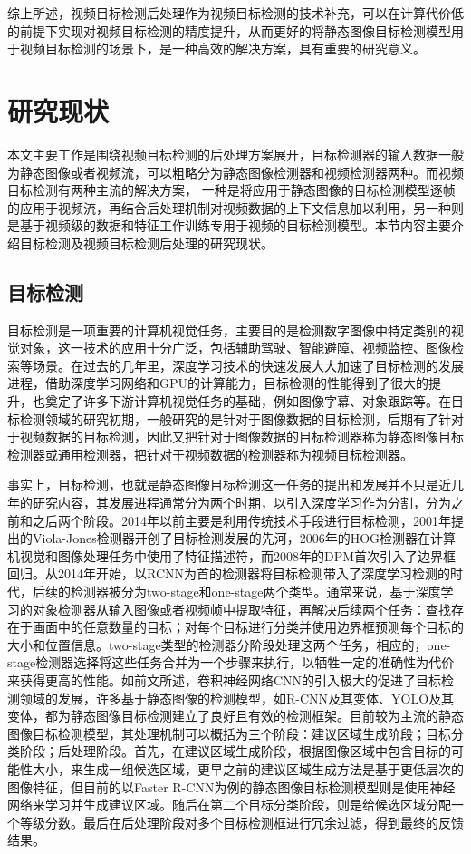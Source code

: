 \documentclass[winfonts,master,twoside,AutoFakeBold= {2}]{njuthesis}
\begin{document}
综上所述，视频目标检测后处理作为视频目标检测的技术补充，可以在计算代价低的前提下实现对视频目标检测的精度提升，从而更好的将静态图像目标检测模型用于视频目标检测的场景下，是一种高效的解决方案，具有重要的研究意义。


\section{研究现状}\label{subsec:mptcp_conges}
本文主要工作是围绕视频目标检测的后处理方案展开，目标检测器的输入数据一般为静态图像或者视频流，可以粗略分为静态图像检测器和视频检测器两种。而视频目标检测有两种主流的解决方案， 一种是将应用于静态图像的目标检测模型逐帧的应用于视频流，再结合后处理机制对视频数据的上下文信息加以利用，另一种则是基于视频级的数据和特征工作训练专用于视频的目标检测模型。本节内容主要介绍目标检测及视频目标检测后处理的研究现状。
\subsection{目标检测}
目标检测是一项重要的计算机视觉任务，主要目的是检测数字图像中特定类别的视觉对象，这一技术的应用十分广泛，包括辅助驾驶、智能避障、视频监控、图像检索等场景。在过去的几年里，深度学习技术的快速发展大大加速了目标检测的发展进程，借助深度学习网络和GPU的计算能力，目标检测的性能得到了很大的提升，也奠定了许多下游计算机视觉任务的基础，例如图像字幕、对象跟踪等。在目标检测领域的研究初期，一般研究的是针对于图像数据的目标检测，后期有了针对于视频数据的目标检测，因此又把针对于图像数据的目标检测器称为静态图像目标检测器或通用检测器，把针对于视频数据的检测器称为视频目标检测器。

事实上，目标检测，也就是静态图像目标检测这一任务的提出和发展并不只是近几年的研究内容，其发展进程通常分为两个时期，以引入深度学习作为分割，分为之前和之后两个阶段。2014年以前主要是利用传统技术手段进行目标检测，2001年提出的Viola-Jones检测器开创了目标检测发展的先河，2006年的HOG检测器在计算机视觉和图像处理任务中使用了特征描述符，而2008年的DPM首次引入了边界框回归。从2014年开始，以RCNN为首的检测器将目标检测带入了深度学习检测的时代，后续的检测器被分为two-stage和one-stage两个类型。通常来说，基于深度学习的对象检测器从输入图像或者视频帧中提取特征，再解决后续两个任务：查找存在于画面中的任意数量的目标；对每个目标进行分类并使用边界框预测每个目标的大小和位置信息。two-stage类型的检测器分阶段处理这两个任务，相应的，one-stage检测器选择将这些任务合并为一个步骤来执行，以牺牲一定的准确性为代价来获得更高的性能。如前文所述，卷积神经网络CNN的引入极大的促进了目标检测领域的发展，许多基于静态图像的检测模型，如R-CNN及其变体、YOLO及其变体，都为静态图像目标检测建立了良好且有效的检测框架。目前较为主流的静态图像目标检测模型，其处理机制可以概括为三个阶段：建议区域生成阶段；目标分类阶段；后处理阶段。首先，在建议区域生成阶段，根据图像区域中包含目标的可能性大小，来生成一组候选区域，更早之前的建议区域生成方法是基于更低层次的图像特征，但目前的以Faster R-CNN为例的静态图像目标检测模型则是使用神经网络来学习并生成建议区域。随后在第二个目标分类阶段，则是给候选区域分配一个等级分数。最后在后处理阶段对多个目标检测框进行冗余过滤，得到最终的反馈结果。
\end{document}
